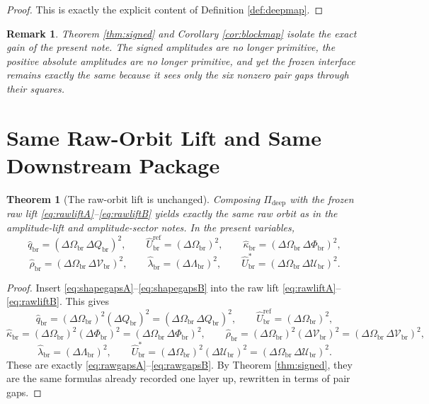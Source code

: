 \documentclass[11pt]{article}
\newcommand{\RespRawReadout}{\widehat q_{\mathrm{br}}}
\newcommand{\RespRawRef}{\widehat U_{\mathrm{br}}^{\mathrm{ref}}}
\newcommand{\RespRawCov}{\widehat\kappa_{\mathrm{br}}}
\newcommand{\RespRawRelax}{\widehat\rho_{\mathrm{br}}}
\newcommand{\RespRawWell}{\widehat\lambda_{\mathrm{br}}}
\newcommand{\RespRawEq}{\widehat U_{\mathrm{br}}^{\ast}}
\newcommand{\DeepMap}{\Pi_{\mathrm{deep}}}
\newcommand{\GapRead}{\Delta Q_{\mathrm{br}}}
\newcommand{\GapCov}{\Delta \Phi_{\mathrm{br}}}
\newcommand{\GapRelax}{\Delta \mathcal V_{\mathrm{br}}}
\newcommand{\GapWell}{\Delta \Lambda_{\mathrm{br}}}
\newcommand{\GapEq}{\Delta \mathcal U_{\mathrm{br}}}
\newcommand{\GapScale}{\Delta \Omega_{\mathrm{br}}}
\newtheorem{remark}{Remark}
\newtheorem{theorem}{Theorem}
\begin{document}
\begin{proof}
This is exactly the explicit content of Definition \ref{def:deepmap}.
\end{proof}

\begin{remark}
Theorem \ref{thm:signed} and Corollary \ref{cor:blockmap} isolate the exact gain of the present note. The signed amplitudes are no longer primitive, the positive absolute amplitudes are no longer primitive, and yet the frozen interface remains exactly the same because it sees only the six nonzero pair gaps through their squares.
\end{remark}

\section{Same Raw-Orbit Lift and Same Downstream Package}

\begin{theorem}[The raw-orbit lift is unchanged]
\label{thm:rawlift}
Composing \(\DeepMap\) with the frozen raw lift \eqref{eq:rawliftA}--\eqref{eq:rawliftB} yields exactly the same raw orbit as in the amplitude-lift and amplitude-sector notes. In the present variables,
\begin{equation}
\RespRawReadout=(\GapScale\,\GapRead)^{2},
\qquad
\RespRawRef=(\GapScale)^{2},
\qquad
\RespRawCov=(\GapScale\,\GapCov)^{2},
\label{eq:rawgapsA}
\end{equation}
\begin{equation}
\RespRawRelax=(\GapScale\,\GapRelax)^{2},
\qquad
\RespRawWell=(\GapWell)^{2},
\qquad
\RespRawEq=(\GapScale\,\GapEq)^{2}.
\label{eq:rawgapsB}
\end{equation}
\end{theorem}

\begin{proof}
Insert \eqref{eq:shapegapsA}--\eqref{eq:shapegapsB} into the raw lift \eqref{eq:rawliftA}--\eqref{eq:rawliftB}. This gives
\[
\RespRawReadout=(\GapScale)^{2}(\GapRead)^{2}=(\GapScale\,\GapRead)^{2},
\qquad
\RespRawRef=(\GapScale)^{2},
\]
\[
\RespRawCov=(\GapScale)^{2}(\GapCov)^{2}=(\GapScale\,\GapCov)^{2},
\qquad
\RespRawRelax=(\GapScale)^{2}(\GapRelax)^{2}=(\GapScale\,\GapRelax)^{2},
\]
\[
\RespRawWell=(\GapWell)^{2},
\qquad
\RespRawEq=(\GapScale)^{2}(\GapEq)^{2}=(\GapScale\,\GapEq)^{2}.
\]
These are exactly \eqref{eq:rawgapsA}--\eqref{eq:rawgapsB}. By Theorem \ref{thm:signed}, they are the same formulas already recorded one layer up, rewritten in terms of pair gaps.
\end{proof}
\end{document}
